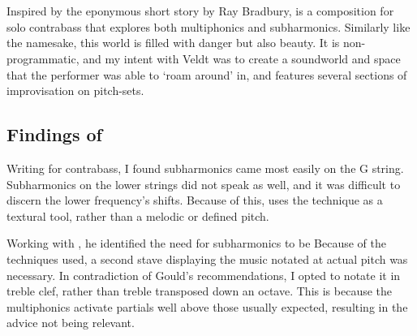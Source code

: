 \section{\bassPiece} \label{sec:bassPiece}
Inspired by the eponymous short story by Ray Bradbury, \bassPiece  is a composition for solo contrabass that explores both multiphonics and subharmonics. 
Similarly like the namesake, this world is filled with danger but also beauty. 
It is non-programmatic, and my intent with Veldt was to create a soundworld and space that the performer was able to `roam around' in, and features several sections of improvisation on pitch-sets.

\subsection{Findings of \bassPiece}
Writing for contrabass, I found subharmonics came most easily on the G string. 
Subharmonics on the lower strings did not speak as well, and it was difficult to discern the lower frequency's shifts.
Because of this, \bassPiece uses the technique as a textural tool, rather than a melodic or defined pitch.

Working with \bassParticipant, he identified the need for subharmonics to be 
Because of the techniques used, a second stave displaying the music notated at actual pitch was necessary.
In contradiction of Gould's recommendations, I opted to notate it in treble clef, rather than treble transposed down an octave.\autocite[423]{gouldBars2011}
This is because the multiphonics activate partials well above those usually expected, resulting in the advice not being relevant.


